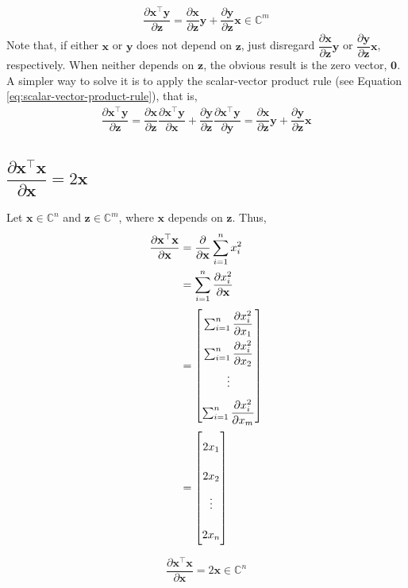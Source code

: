 \documentclass{article}
\newcommand{\trans}{\top}
\begin{document}
\begin{align}
    \boxed{\dfrac{\partial \mathbf{x}^\trans \mathbf{y}}{\partial \mathbf{z}} = \dfrac{\partial \mathbf{x}}{\partial \mathbf{z}}\mathbf{y} + \dfrac{\partial \mathbf{y}}{\partial \mathbf{z}}\mathbf{x} \in \mathbb{C}^{m}}
\end{align}
Note that, if either \(\mathbf{x}\) or \(\mathbf{y}\) does not depend on \(\mathbf{z}\), just disregard \(\dfrac{\partial \mathbf{x}}{\partial \mathbf{z}}\mathbf{y}\) or \(\dfrac{\partial \mathbf{y}}{\partial \mathbf{z}}\mathbf{x}\), respectively. When neither depends on \(\mathbf{z}\), the obvious result is the zero vector, \(\mathbf{0}\). A simpler way to solve it is to apply the scalar-vector product rule (see Equation \eqref{eq:scalar-vector-product-rule}), that is,
\begin{align}
    \dfrac{\partial \mathbf{x}^\trans \mathbf{y}}{\partial \mathbf{z}} = \dfrac{\partial \mathbf{x}}{\partial \mathbf{z}} \dfrac{\partial \mathbf{x}^\trans \mathbf{y}}{\partial \mathbf{x}} + \dfrac{\partial \mathbf{y}}{\partial \mathbf{z}} \dfrac{\partial \mathbf{x}^\trans \mathbf{y}}{\partial \mathbf{y}} = \dfrac{\partial \mathbf{x}}{\partial \mathbf{z}}\mathbf{y} + \dfrac{\partial \mathbf{y}}{\partial \mathbf{z}}\mathbf{x}
\end{align}

\subsection{\(\dfrac{\partial \mathbf{x}^\trans \mathbf{x}}{\partial \mathbf{x}} = 2\mathbf{x}\)}
Let \(\mathbf{x} \in \mathbb{C}^{n}\) and \(\mathbf{z}\in \mathbb{C}^m\), where \(\mathbf{x}\) depends on \(\mathbf{z}\). Thus,
\begin{align}
    \dfrac{\partial \mathbf{x}^\trans \mathbf{x}}{\partial \mathbf{x}} & = \dfrac{\partial}{\partial \mathbf{x}}\sum_{i=1}^{n} x_i^2 \\
    & = \sum_{i=1}^{n} \dfrac{\partial x_i^2}{\partial \mathbf{x}} \\
    & = \renewcommand{\arraystretch}{2.2}\begin{bmatrix}
        \sum_{i=1}^{n} \dfrac{\partial x_i^2}{\partial x_1} \\
        \sum_{i=1}^{n} \dfrac{\partial x_i^2}{\partial x_2} \\
        \vdots \\
        \sum_{i=1}^{n} \dfrac{\partial x_i^2}{\partial x_m} \\
    \end{bmatrix} \\
    & = \renewcommand{\arraystretch}{2.2}\begin{bmatrix}
        2x_1 \\
        2x_2 \\
        \vdots \\
        2x_n \\
    \end{bmatrix}
\end{align}
\begin{align}
    \boxed{\dfrac{\partial \mathbf{x}^\trans \mathbf{x}}{\partial \mathbf{x}} = 2\mathbf{x} \in \mathbb{C}^n}
\end{align}
\end{document}

